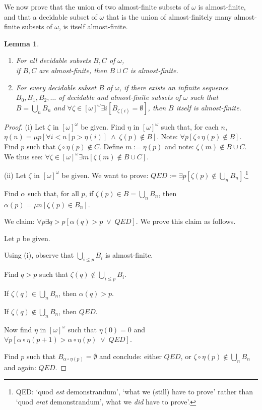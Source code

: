 \documentclass[a4paper]{amsart}
\theoremstyle{plain}
\newtheorem{lemma}[theorem]{Lemma}
\begin{document}
 
 We now prove that the union of two almost-finite subsets of $\omega$ is almost-finite, and that a decidable subset of $\omega$ that is the union of almost-finitely many almost-finite subsets of $\omega$,   is itself almost-finite.

\begin{lemma}\label{L:almost-finite} \begin{enumerate}[\upshape (i)] \item For all decidable subsets $B,C$ of $\omega$, \\if $B,C$ are almost-finite, then $B\cup C$ is almost-finite. \item For every decidable subset $B$ of $\omega$, if there  exists an infinite sequence \\$B_0, B_1, B_2, \ldots$ of decidable and almost-finite subsets of $\omega$ such that\\$B=\bigcup_n B_n$  and $\forall \zeta\in [\omega]^\omega\exists i[B_{\zeta(i)}=\emptyset]$, then $B$ itself is almost-finite. \end{enumerate}\end{lemma} 

\begin{proof} (i) Let $\zeta$ in $[\omega]^\omega$ be given. Find $\eta$ in $[\omega]^\omega$ such that, for each $n$, \\$\eta(n)=\mu p[\forall i<n[p>\eta(i)]\;\wedge\;\zeta(p) \notin B]$. Note: $\forall p[\zeta\circ\eta(p)\notin B]$. \\Find $p$ such that $\zeta\circ\eta(p)\notin C$. Define $m:=\eta(p)$ and note: $\zeta(m) \notin B\cup C$. \\We thus see: $\forall \zeta \in[\omega]^\omega\exists m[\zeta(m)\notin B\cup C]$.

\smallskip (ii) Let $\zeta$ in $[\omega]^\omega$ be given. We want to prove: $QED:=\exists p[\zeta(p)\notin \bigcup_n B_n]$.\footnote{QED: `quod \emph{est} demonstrandum', `what we (still) have to prove' rather than `quod \emph{erat} demonstrandum', what we \emph{did} have to prove'.}



Find $\alpha$ such that, for all $p$, if $\zeta(p)\in B=\bigcup_n B_n$, then $\alpha(p)=\mu n[\zeta(p)\in B_n]$. 

 We claim: $\forall p \exists q>p[\alpha(q)>p \;\vee\; QED]$.
 We prove this claim as follows. 
 
 Let $p$ be given. 
 
 Using (i), observe that $\bigcup_{i\le p}B_i$ is almost-finite. 
 
 Find $q>p$ such that $\zeta(q) \notin \bigcup_{i \le p}B_i$.
 
 If $\zeta(q) \in \bigcup_n B_n$, then $\alpha(q)>p$.
 
 If $\zeta(q) \notin \bigcup_n B_n$, then $QED$.  
 
 \smallskip Now find $\eta$ in $[\omega]^\omega$ such that $\eta(0)=0$ and $\forall p[\alpha\circ\eta(p+1)> \alpha\circ\eta(p) \;\vee\; QED]$.
 
 Find $p$ such that $B_{\alpha\circ\eta(p)}=\emptyset$ and conclude: either $QED$, or $\zeta\circ \eta(p)\notin \bigcup_nB_n$ and again: $QED$.  \end{proof}
 
\end{document}
